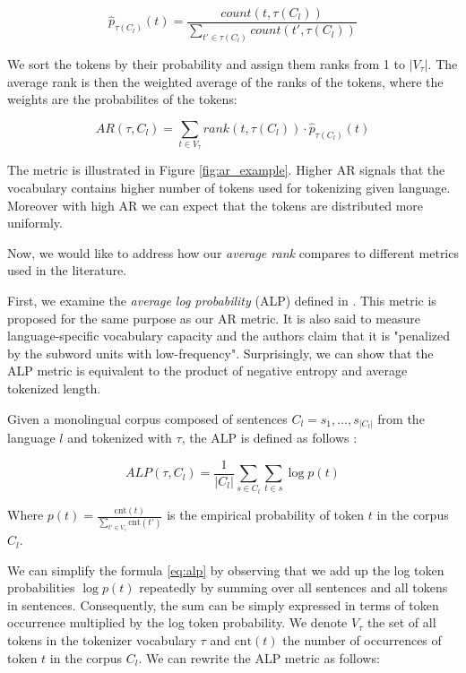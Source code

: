 \begin{equation}
    \hat{p}_{\tau(C_l)}(t) = \frac{count(t, \tau(C_l))}{\sum_{t' \in \tau(C_l)} count(t', \tau(C_l))}
\end{equation}

We sort the tokens by their probability and assign them ranks from 1 to $|V_\tau|$. The average rank is then the weighted average of the ranks of the tokens, where the weights are the probabilites of the tokens:

\begin{equation}
    AR(\tau, C_l) = \sum_{t \in V_\tau} rank(t, \tau(C_l)) \cdot \hat{p}_{\tau(C_l)}(t)
\end{equation}

The metric is illustrated in Figure \ref{fig:ar_example}. Higher AR signals that the vocabulary contains higher number of tokens used for tokenizing given language. Moreover with high AR we can expect that the tokens are distributed more uniformly.

Now, we would like to address how our \textit{average rank} compares to different metrics used in the literature. 

First, we examine the \textit{average log probability} (ALP) defined in \citet{zheng_allocating_2021}. This metric is proposed for the same purpose as our AR metric. It is also said to measure language-specific vocabulary capacity and the authors claim that it is "penalized by the subword units with low-frequency". Surprisingly, we can show that the ALP metric is equivalent to the product of negative entropy and average tokenized length.

Given a monolingual corpus composed of sentences $C_l = {s_1, ..., s_{|C_l|}}$ from the language $l$ and tokenized with $\tau$, the ALP is defined as follows \cite{zheng_allocating_2021}:

\begin{equation}
\label{eq:alp}
    ALP(\tau, C_l) = \frac{1}{|C_l|} \sum_{s \in C_l} \sum_{t \in s} \log p(t)
\end{equation}

Where $p(t) = \frac{\mathrm{cnt}(t)}{\sum_{t' \in V_\tau} \mathrm{cnt}(t')}$ is the empirical probability of token $t$ in the corpus $C_l$. 


We can simplify the formula \autoref{eq:alp} by observing that we add up the log token probabilities $\log p(t)$ repeatedly by summing over all sentences and all tokens in sentences. Consequently, the sum can be simply expressed in terms of token occurrence multiplied by the log token probability. We denote $V_\tau$ the set of all tokens in the tokenizer vocabulary $\tau$ and $\mathrm{cnt}(t)$ the number of occurrences of token $t$ in the corpus $C_l$. We can rewrite the ALP metric as follows:

